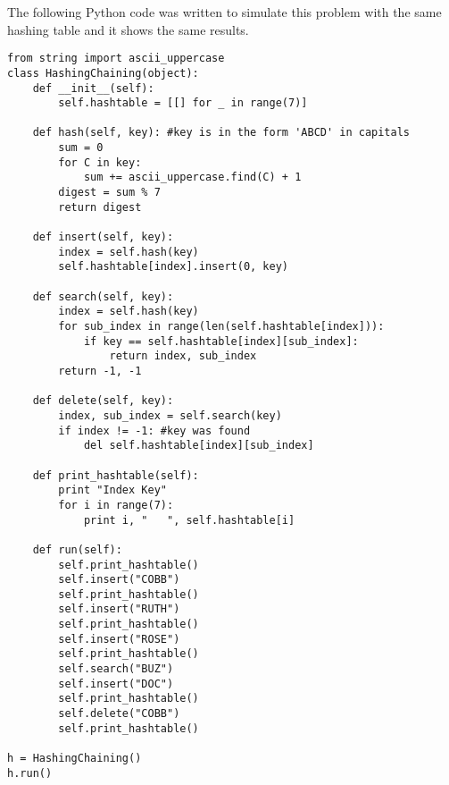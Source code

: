 \documentclass[11pt]{article}
\begin{document}
\begin{enumerate}
    The following Python code was written to simulate this problem with the same hashing table and it shows the same results.
    \begin{verbatim}
from string import ascii_uppercase        
class HashingChaining(object):
    def __init__(self):
        self.hashtable = [[] for _ in range(7)]
        
    def hash(self, key): #key is in the form 'ABCD' in capitals
        sum = 0
        for C in key:
            sum += ascii_uppercase.find(C) + 1
        digest = sum % 7
        return digest
        
    def insert(self, key):
        index = self.hash(key)
        self.hashtable[index].insert(0, key)
        
    def search(self, key):
        index = self.hash(key)
        for sub_index in range(len(self.hashtable[index])):
            if key == self.hashtable[index][sub_index]:
                return index, sub_index
        return -1, -1
        
    def delete(self, key):
        index, sub_index = self.search(key)
        if index != -1: #key was found
            del self.hashtable[index][sub_index]
            
    def print_hashtable(self):
        print "Index Key"
        for i in range(7):
            print i, "   ", self.hashtable[i]
            
    def run(self):
        self.print_hashtable()
        self.insert("COBB")
        self.print_hashtable()
        self.insert("RUTH")
        self.print_hashtable()
        self.insert("ROSE")
        self.print_hashtable()
        self.search("BUZ")
        self.insert("DOC")
        self.print_hashtable()
        self.delete("COBB")
        self.print_hashtable()
        
h = HashingChaining()
h.run()
    \end{verbatim}


\end{enumerate}
\end{document}
